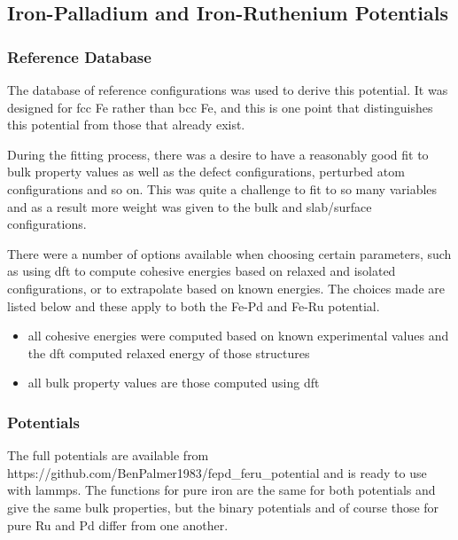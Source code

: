 \FloatBarrier
\subsection{Iron-Palladium and Iron-Ruthenium Potentials}
\label{section:fepdpotentialresult}

\subsubsection{Reference Database}

The database of reference configurations was used to derive this potential.  It was designed for \acrshort{fcc} Fe rather than \acrshort{bcc} Fe, and this is one point that distinguishes this potential from those that already exist.

During the fitting process, there was a desire to have a reasonably good fit to bulk property values as well as the defect configurations, perturbed atom configurations and so on.  This was quite a challenge to fit to so many variables and as a result more weight was given to the bulk and slab/surface configurations.

There were a number of options available when choosing certain parameters, such as using \acrshort{dft} to compute cohesive energies based on relaxed and isolated configurations, or to extrapolate based on known energies.  The choices made are listed below and these apply to both the Fe-Pd and Fe-Ru potential.

\begin{itemize}
\item all cohesive energies were computed based on known experimental values and the \acrshort{dft} computed relaxed energy of those structures
\item all bulk property values are those computed using \acrshort{dft}
\end{itemize}
 

\subsubsection{Potentials}

The full potentials are available from https://github.com/BenPalmer1983/fepd\_feru\_potential and is ready to use with \acrshort{lammps}.  The functions for pure iron are the same for both potentials and give the same bulk properties, but the binary potentials and of course those for pure Ru and Pd differ from one another.

